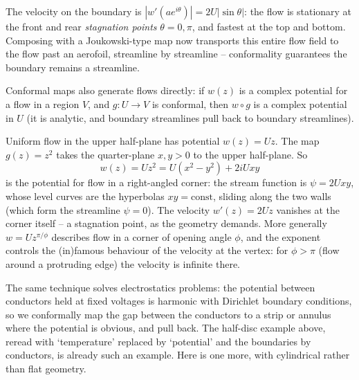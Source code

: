 \documentclass[a4paper]{scrartcl}
\begin{document}
\begin{example}
\begin{center}
	\end{center}
	The velocity on the boundary is $|w'(ae^{i\theta})| = 2U|\sin\theta|$: the flow is stationary at the front and rear \emph{stagnation points} $\theta = 0, \pi$, and fastest at the top and bottom. Composing with a Joukowski-type map now transports this entire flow field to the flow past an aerofoil, streamline by streamline -- conformality guarantees the boundary remains a streamline.
\end{example}

\begin{example}
	Conformal maps also generate flows directly: if $w(z)$ is a complex potential for a flow in a region $V$, and $g : U \to V$ is conformal, then $w \circ g$ is a complex potential in $U$ (it is analytic, and boundary streamlines pull back to boundary streamlines).

	Uniform flow in the upper half-plane has potential $w(z) = Uz$. The map $g(z) = z^2$ takes the quarter-plane $x, y > 0$ to the upper half-plane. So
	$$
	w(z) = U z^2 = U(x^2 - y^2) + 2iUxy
	$$
	is the potential for flow in a right-angled corner: the stream function is $\psi = 2Uxy$, whose level curves are the hyperbolas $xy = \text{const}$, sliding along the two walls (which form the streamline $\psi = 0$). The velocity $w'(z) = 2Uz$ vanishes at the corner itself -- a stagnation point, as the geometry demands. More generally $w = Uz^{\pi/\phi}$ describes flow in a corner of opening angle $\phi$, and the exponent controls the (in)famous behaviour of the velocity at the vertex: for $\phi > \pi$ (flow around a protruding edge) the velocity is infinite there.
\end{example}

The same technique solves electrostatics problems: the potential between conductors held at fixed voltages is harmonic with Dirichlet boundary conditions, so we conformally map the gap between the conductors to a strip or annulus where the potential is obvious, and pull back. The half-disc example above, reread with `temperature' replaced by `potential' and the boundaries by conductors, is already such an example. Here is one more, with cylindrical rather than flat geometry.
\end{document}
